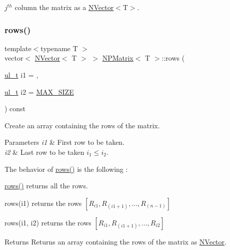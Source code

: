 $ j^{th} $ column the matrix as a {\ttfamily \mbox{\hyperlink{class_n_vector}{N\+Vector}}$<$T$>$}. 

\mbox{\label{class_n_p_matrix_add861e9e1df81af2546c3eab1fd40d51}} 
\subsubsection{\texorpdfstring{rows()}{rows()}}
{\footnotesize\ttfamily template$<$typename T $>$ \\
vector$<$ \mbox{\hyperlink{class_n_vector}{N\+Vector}}$<$ T $>$ $>$ \mbox{\hyperlink{class_n_p_matrix}{N\+P\+Matrix}}$<$ T $>$\+::rows (\begin{DoxyParamCaption}\item[{\mbox{\hyperlink{typedef_8h_a1b140a2034db3f5dfe18a987745df43a}{ul\+\_\+t}}}]{i1 = {},  }\item[{\mbox{\hyperlink{typedef_8h_a1b140a2034db3f5dfe18a987745df43a}{ul\+\_\+t}}}]{i2 = {\ttfamily \mbox{\hyperlink{_n_vector_8h_a0592dba56693fad79136250c11e5a7fe}{M\+A\+X\+\_\+\+S\+I\+ZE}}} }\end{DoxyParamCaption}) const}



Create an array containing the rows of the matrix. 


\begin{DoxyParams}{Parameters}
{\em i1} & First row to be taken. \\
\hline
{\em i2} & Last row to be taken $ i_1 \leq i_2 $.\\
\hline
\end{DoxyParams}
The behavior of {\ttfamily \mbox{\hyperlink{class_n_p_matrix_add861e9e1df81af2546c3eab1fd40d51}{rows()}}} is the following \+:
\begin{DoxyItemize}
\item {\ttfamily \mbox{\hyperlink{class_n_p_matrix_add861e9e1df81af2546c3eab1fd40d51}{rows()}}} returns all the rows.
\item {\ttfamily rows(i1)} returns the rows $ [R_{i1}, R_{(i1+1)},..., R_{(n-1)}] $
\item {\ttfamily rows(i1, i2)} returns the rows $ [R_{i1}, R_{(i1+1)},..., R_{i2}] $
\end{DoxyItemize}

\begin{DoxyReturn}{Returns}
Returns an array containing the rows of the matrix as {\ttfamily \mbox{\hyperlink{class_n_vector}{N\+Vector}}}. 
\end{DoxyReturn}
\mbox{\label{class_n_p_matrix_a30c8ad7b415fa92a23375cbad3ee8e37}} 
